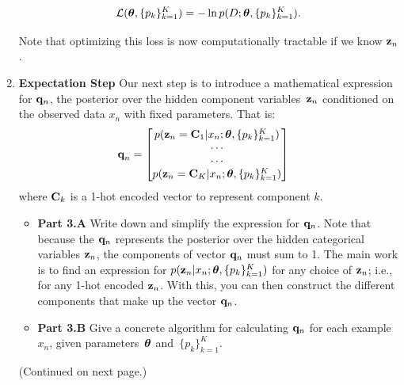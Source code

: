 \documentclass[submit]{harvardml}
\begin{document}
\begin{problem}
\begin{enumerate}
\[\mathcal{L}(\boldsymbol{\theta}, \{p_k\}^K_{k=1}) =  -\ln p(D; \boldsymbol{\theta}, \{p_k\}^K_{k=1}).\]

Note that optimizing
  this loss is now computationally tractable if we know $\mathbf{z}_n$.

\item \textbf{Expectation Step} Our next step is to introduce a
  mathematical expression for $\mathbf{q}_n$, the posterior over the
  hidden component variables~$\mathbf{z}_n$ conditioned on the observed data
  $x_n$ with fixed parameters.
That is:
  \begin{align*}
    \textbf{q}_n &= \begin{bmatrix}
      p(\mathbf{z}_n =\mathbf{C}_1| x_n; \boldsymbol{\theta}, \{ p_k \}^K_{k=1})
      \\
      \cdots
      \\
      \cdots
      \\
      p(\mathbf{z}_n =\mathbf{C}_K| x_n; \boldsymbol{\theta}, \{ p_k \}^K_{k=1})
    \end{bmatrix} 
  \end{align*}
  where $\mathbf{C}_k$ is a 1-hot encoded vector to represent component $k$.
%
\begin{itemize}
\item  \textbf{Part 3.A } Write down and simplify the expression for
  $\mathbf{q}_n$.  Note that because the $\mathbf{q}_n$ represents the
  posterior over the hidden categorical variables $\mathbf{z}_n$, the
  components of vector $\mathbf{q}_n$ must sum to 1.
The main work is to find an expression for $p(\mathbf{z}_n|x_n; \boldsymbol{\theta}, \{p_k\}^K_{k=1})$  for any choice of $\mathbf{z}_n$; i.e., for any 1-hot encoded $\mathbf{z}_n$. With this, you can then construct the different components that make up the vector $\mathbf{q}_n$.
  

\item  \textbf{Part 3.B } Give a concrete  algorithm for calculating
  $\mathbf{q}_n$ for each example $x_n$, given parameters~$\boldsymbol{\theta}$ and~$\{ p_k\}^K_{k=1}$.

\end{itemize}


  (Continued on next page.)
\end{enumerate}

\end{problem}

\newpage
\end{document}
